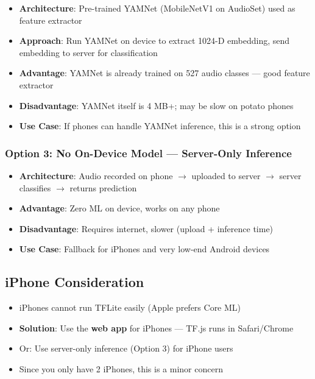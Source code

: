 \documentclass[11pt,a4paper]{article}
\begin{document}
\begin{itemize}[leftmargin=*,noitemsep]
    \item \textbf{Architecture}: Pre-trained YAMNet (MobileNetV1 on AudioSet) used as feature extractor
    \item \textbf{Approach}: Run YAMNet on device to extract 1024-D embedding, send embedding to server for classification
    \item \textbf{Advantage}: YAMNet is already trained on 527 audio classes — good feature extractor
    \item \textbf{Disadvantage}: YAMNet itself is 4 MB+; may be slow on potato phones
    \item \textbf{Use Case}: If phones can handle YAMNet inference, this is a strong option
\end{itemize}

\subsubsection{Option 3: No On-Device Model — Server-Only Inference}

\begin{itemize}[leftmargin=*,noitemsep]
    \item \textbf{Architecture}: Audio recorded on phone $\rightarrow$ uploaded to server $\rightarrow$ server classifies $\rightarrow$ returns prediction
    \item \textbf{Advantage}: Zero ML on device, works on any phone
    \item \textbf{Disadvantage}: Requires internet, slower (upload + inference time)
    \item \textbf{Use Case}: Fallback for iPhones and very low-end Android devices
\end{itemize}

\subsection{iPhone Consideration}

\begin{itemize}[leftmargin=*,noitemsep]
    \item iPhones cannot run TFLite easily (Apple prefers Core ML)
    \item \textbf{Solution}: Use the \textbf{web app} for iPhones — TF.js runs in Safari/Chrome
    \item Or: Use server-only inference (Option 3) for iPhone users
    \item Since you only have 2 iPhones, this is a minor concern
\end{itemize}
\end{document}
